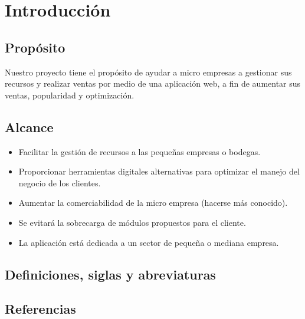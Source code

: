 \chapter{Introducción}

\section{Propósito}

Nuestro proyecto tiene el propósito de ayudar a micro empresas a gestionar sus recursos y realizar ventas por medio de una aplicación web, a fin de aumentar sus ventas, popularidad y optimización.

\section{Alcance}

\begin{itemize}
\item Facilitar la gestión de recursos a las pequeñas empresas o bodegas.
\item Proporcionar herramientas digitales alternativas para optimizar el manejo del negocio de los clientes.
\item Aumentar la comerciabilidad de la micro empresa (hacerse más conocido).
\item Se evitará la sobrecarga de módulos propuestos para el cliente.
\item La aplicación está dedicada a un sector de pequeña o mediana empresa.
\end{itemize}

\section{Definiciones, siglas y abreviaturas}

\section{Referencias}